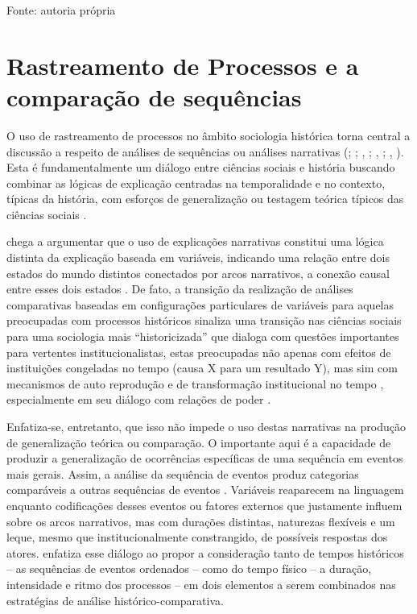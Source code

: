 Fonte: autoria própria

\section{Rastreamento de Processos e a comparação de sequências}\label{rastreamento-de-processos-e-a-comparauxe7uxe3o-de-sequuxeancias}

O uso de rastreamento de processos no âmbito sociologia histórica torna
central a discussão a respeito de análises de sequências ou análises
narrativas (\citep{abbott_sequences_1983}; ;
\citeauthor{abell_narrative_2004}, \citeyear{abell_narrative_2004};
\citeauthor{clemens_toward_2007}, \citeyear{clemens_toward_2007};
\citeauthor{mahoneyfalleti2015}, \citeyear{mahoneyfalleti2015}). Esta é
fundamentalmente um diálogo entre ciências sociais e história buscando
combinar as lógicas de explicação centradas na temporalidade e no
contexto, típicas da história, com esforços de generalização ou
testagem teórica típicos das ciências sociais \citep{abbott_sequences_1983}.

\citet{abell_narrative_2004} chega a argumentar que o uso de explicações
narrativas constitui uma lógica distinta da explicação baseada em
variáveis, indicando uma relação entre dois estados do mundo distintos
conectados por arcos narrativos, a conexão causal entre esses dois
estados \citep[p.~1]{abell_narrative_2004}. De fato, a transição da
realização de análises comparativas baseadas em configurações
particulares de variáveis para aquelas preocupadas com processos
históricos sinaliza uma transição nas ciências sociais para uma
sociologia mais ``historicizada'' \citep{clemens_toward_2007} que
dialoga com questões importantes para vertentes institucionalistas,
estas preocupadas não apenas com efeitos de instituições congeladas no
tempo (causa X para um resultado Y), mas sim com mecanismos de auto
reprodução e de transformação institucional no tempo , especialmente em seu diálogo com relações de poder
.

Enfatiza-se, entretanto, que isso não impede o uso destas narrativas na
produção de generalização teórica ou comparação. O importante aqui é a
capacidade de produzir a generalização de ocorrências específicas de
uma sequência em eventos mais gerais. Assim, a análise da sequência de
eventos produz categorias comparáveis a outras sequências de eventos
\citep{mahoneyfalleti2015}. Variáveis reaparecem na linguagem enquanto
codificações desses eventos ou fatores externos que justamente influem
sobre os arcos narrativos, mas com durações distintas, naturezas
flexíveis e um leque, mesmo que institucionalmente constrangido, de
possíveis respostas dos atores. \citet{kreuzer_grammar_2023} enfatiza
esse diálogo ao propor a consideração tanto de tempos históricos -- as
sequências de eventos ordenados -- como do tempo físico -- a duração,
intensidade e ritmo dos processos -- em dois elementos a serem
combinados nas estratégias de análise histórico-comparativa.

